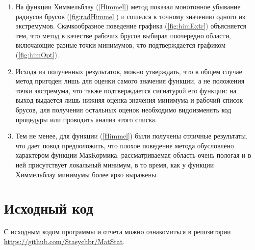 \documentclass[a4paper]{article}
\begin{document}
\begin{enumerate}
    \item На функции Химмельблау (\ref{Himmel}) метод показал монотонное убывание радиусов брусов (\ref{fig:radHimmel}) и сошелся к точному значению одного из экстремумов. Скачкообразное поведение графика (\ref{fig:himExtr}) объясняется тем, что метод в качестве рабочих брусов выбирал поочередно области, включающие разные точки минимумов, что подтверждается графиком (\ref{fig:himOpt}).
    \item Исходя из полученных результатов, можно утверждать, что в общем случае метод пригоден лишь для оценки самого значения функции, а не положения точки экстремума, что также подтверждается сигнатурой его функции: на выход выдается лишь нижняя оценка значения минимума и рабочий список брусов, для получения остальных оценок необходимо видоизменять код процедуры или проводить анализ этого списка.
    \item Тем не менее, для функции (\ref{Himmel}) были получены отличные результаты, что дает повод предположить, что плохое поведение метода обусловлено характером функции МакКормика: рассматриваемая область очень пологая и в ней присутствует локальный минимум, в то время, как у функции Химмельблау минимумы более ярко выражены.
\end{enumerate}
\section*{Исходный код}
С исходным кодом программы и отчета можно ознакомиться в репозитории \url{https://github.com/Stasychbr/MatStat}.
\end{document}
